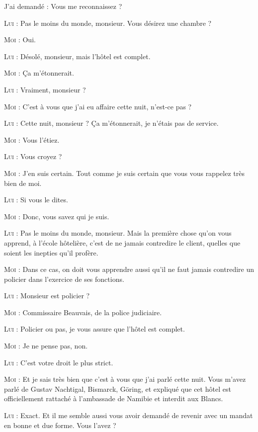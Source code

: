 \begin{dialogue}

J’ai demandé : Vous me reconnaissez ?

\textsc{Lui} : Pas le moins du monde, monsieur. Vous désirez une chambre ?

\textsc{Moi} : Oui.

\textsc{Lui} : Désolé, monsieur, mais l’hôtel est complet.

\textsc{Moi} : Ça m’étonnerait.

\textsc{Lui} : Vraiment, monsieur ?

\textsc{Moi} : C’est à vous que j’ai eu affaire cette nuit, n’est-ce pas ?

\textsc{Lui} : Cette nuit, monsieur ? Ça m’étonnerait, je n’étais pas de service.

\textsc{Moi} : Vous l’étiez.

\textsc{Lui} : Vous croyez ?

\textsc{Moi} : J’en suis certain. Tout comme je suis certain que vous vous rappelez très bien de moi.

\textsc{Lui} : Si vous le dites.

\textsc{Moi} : Donc, vous savez qui je suis.

\textsc{Lui} : Pas le moins du monde, monsieur. Mais la première chose qu’on vous apprend, à l’école hôtelière, c’est de ne jamais contredire le client, quelles que soient les inepties qu’il profère.

\textsc{Moi} : Dans ce cas, on doit vous apprendre aussi qu’il ne faut jamais contredire un policier dans l’exercice de ses fonctions.

\textsc{Lui} : Monsieur est policier ?

\textsc{Moi} : Commissaire Beauvais, de la police judiciaire.

\textsc{Lui} : Policier ou pas, je vous assure que l’hôtel est complet.

\textsc{Moi} : Je ne pense pas, non.

\textsc{Lui} : C’est votre droit le plus strict.

\textsc{Moi} : Et je sais très bien que c’est à vous que j’ai parlé cette nuit. Vous m’avez parlé de Gustav Nachtigal, Bismarck, Göring, et expliqué que cet hôtel est officiellement rattaché à l’ambassade de Namibie et interdit aux Blancs.

\textsc{Lui} : Exact. Et il me semble aussi vous avoir demandé de revenir avec un mandat en bonne et due forme. Vous l’avez ?


\end{dialogue}
